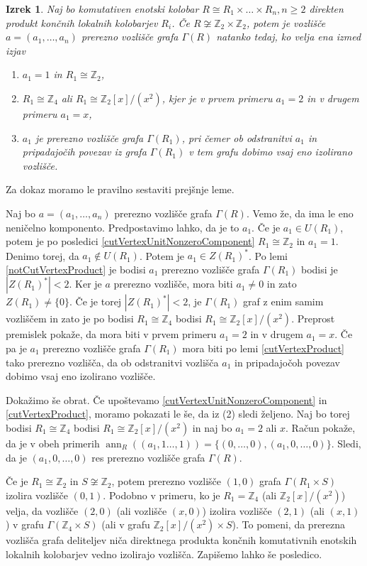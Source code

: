\documentclass[a4paper, 12pt]{amsart}
\theoremstyle{definition} %
\theoremstyle{plain} %
\newtheorem{izrek}[definicija]{Izrek}
\newcommand{\Z}{\mathbb Z}
\DeclareMathOperator{\ann}{ann}
\begin{document}
\begin{izrek}
\label{cutVertexClassification}
Naj bo komutativen enotski kolobar $R\cong R_1\times \dots \times R_n, n\ge2$ direkten produkt končnih lokalnih kolobarjev $R_i$. Če $R\not\cong \Z_2 \times \Z_2$, potem je vozlišče $a=(a_1,\dots,a_n)$ prerezno vozlišče grafa $\Gamma(R)$ natanko tedaj, ko velja ena izmed  izjav
\begin{enumerate}
\item $a_1=1$ in $R_1 \cong \Z_2$,
\item $R_1\cong \Z_4$ ali $R_1\cong \Z_2[x]/(x^2)$, kjer je v prvem primeru $a_1=2$ in v drugem primeru $a_1 = x$,
\item $a_1$ je prerezno vozlišče grafa $\Gamma(R_1)$, pri čemer ob odstranitvi $a_1$ in pripadajočih povezav iz grafa $\Gamma(R_1)$ v tem grafu dobimo vsaj eno izolirano vozlišče.
\end{enumerate}
\end{izrek}
Za dokaz moramo le pravilno sestaviti prejšnje leme.

\proof
Naj bo $a=(a_1,\dots,a_n)$ prerezno vozlišče grafa $\Gamma(R)$. Vemo že, da ima le eno neničelno komponento. Predpostavimo lahko, da je to $a_1$. Če je $a_1\in U(R_1)$, potem je po posledici  \ref{cutVertexUnitNonzeroComponent} $R_1\cong \Z_2$ in $a_1 = 1$. Denimo torej, da $a_1 \notin U(R_1)$. Potem je $a_1 \in Z(R_1)^*$. Po lemi \ref{notCutVertexProduct} je bodisi $a_1$ prerezno vozlišče grafa $\Gamma(R_1)$ bodisi je $|Z(R_1)^*| < 2$. Ker je $a$ prerezno vozlišče, mora biti $a_1\neq 0$ in zato $Z(R_1) \neq \{0\}$. Če je torej $|Z(R_1)^*| < 2$, je $\Gamma(R_1)$ graf z enim samim vozliščem in zato je po \cite{Anderson-klasifikacijaMalihGrafov} bodisi $R_1  \cong \Z_4$ bodisi $R_1  \cong \Z_2[x]/(x^2)$. Preprost premislek pokaže, da mora biti v prvem primeru $a_1 = 2$ in v drugem $a_1 = x$. Če pa je $a_1$ prerezno vozlišče grafa $\Gamma(R_1)$ mora biti po lemi \ref{cutVertexProduct} tako prerezno vozlišča, da ob odstranitvi vozlišča $a_1$ in pripadajočoh povezav dobimo vsaj eno izolirano vozlišče.

Dokažimo še obrat. Če upoštevamo \ref{cutVertexUnitNonzeroComponent} in \ref{cutVertexProduct}, moramo pokazati le še, da iz (2) sledi željeno. Naj bo torej bodisi $R_1\cong \Z_4$ bodisi $R_1 \cong \Z_2[x]/(x^2)$ in naj bo $a_1 = 2$ ali $x$. Račun pokaže, da je v obeh primerih $ \ann_R((a_1,1\dots,1)) = \{(0,\dots,0),(a_1,0,\dots,0)\}$. Sledi, da je $(a_1,0,\dots,0)$ res prerezno vozlišče grafa $\Gamma(R)$.
\endproof

Če je $R_1\cong \Z_2$ in $S\not\cong \Z_2$, potem prerezno vozlišče $(1,0)$ grafa $\Gamma(R_1\times S) $ izolira vozlišče $(0,1)$. Podobno v primeru, ko je $R_1 = \Z_4$ (ali $\Z_2[x]/(x^2)$) velja, da vozlišče $(2,0)$ (ali vozlišče $(x,0)$) izolira vozlišče $(2,1)$ (ali $(x,1)$) v grafu $\Gamma(\Z_4 \times S)$ (ali v grafu $\Z_2[x]/(x^2) \times S$). To pomeni, da prerezna vozlišča grafa deliteljev niča direktnega produkta končnih komutativnih enotskih lokalnih kolobarjev vedno izolirajo vozlišča. Zapišemo lahko še posledico.
\end{document}
